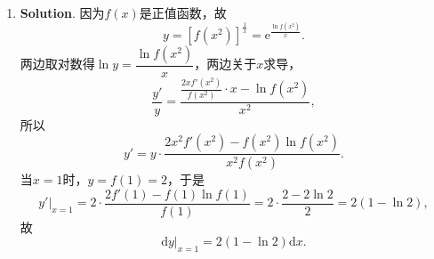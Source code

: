 \documentclass[../main.tex]{subfiles}
\begin{document}
\begin{enumerate}
    \item \textbf{Solution}. 因为$f(x)$是正值函数，故
          \[
              y=\left[f\left(x^{2}\right)\right]^{\frac{1}{x}}=\mathrm{e}^{\frac{\ln f\left(x^{2}\right)}{x}}.
          \]
          两边取对数得$\ln y=\dfrac{\ln f\left(x^{2}\right)}{x}$，两边关于$x$求导，
          \[
              \frac{y'}{y}=\frac{\frac{2xf'\left(x^{2}\right)}{f\left(x^{2}\right)}\cdot x-\ln f\left(x^{2}\right)}{x^{2}},
          \]
          所以
          \[
              y'=y\cdot\frac{2x^{2}f'\left(x^{2}\right)-f\left(x^{2}\right)\ln f\left(x^{2}\right)}{x^{2}f\left(x^{2}\right)}.
          \]
          当$x=1$时，$y=f(1)=2$，于是
          \[
              \left.y'\right|_{x=1}=2\cdot\frac{2f'(1)-f(1)\ln f(1)}{f(1)}=2\cdot\frac{2-2\ln2}{2}=2\left(1-\ln2\right),
          \]
          故
          \[
              \left.\mathrm{d}y\right|_{x=1}=2\left(1-\ln2\right)\mathrm{d}x.
          \]
\end{enumerate}
\end{document}
